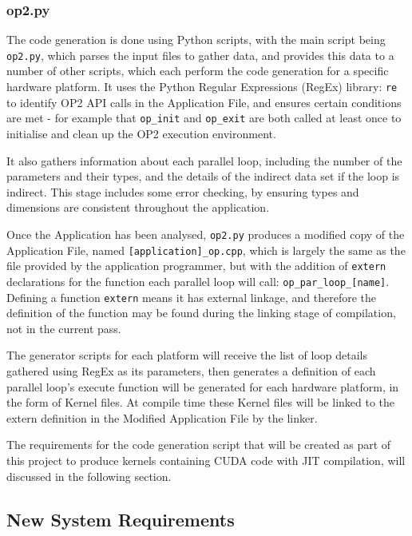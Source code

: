 \subsubsection{op2.py}
\label{ss:impl_op2}
The code generation is done using Python scripts, with the main script being \verb|op2.py|, which parses the input files to gather data, and provides this data to a number of other scripts, which each perform the code generation for a specific hardware platform. It uses the Python Regular Expressions (RegEx) library: \verb|re| \cite{re} to identify OP2 API calls in the Application File, and ensures certain conditions are met - for example that \verb|op_init| and \verb|op_exit| are both called at least once to initialise and clean up the OP2 execution environment.
\par
It also gathers information about each parallel loop, including the number of the parameters and their types, and the details of the indirect data set if the loop is indirect. This stage includes some error checking, by ensuring types and dimensions are consistent throughout the application.
\par
Once the Application has been analysed, \verb|op2.py| produces a modified copy of the Application File, named \verb|[application]_op.cpp|, which is largely the same as the file provided by the application programmer, but with the addition of \verb|extern| declarations for the function each parallel loop will call: \verb|op_par_loop_[name]|. Defining a function \verb|extern| means it has external linkage, and therefore the definition of the function may be found during the linking stage of compilation, not in the current pass.
\par
The generator scripts for each platform will receive the list of loop details gathered using RegEx as its parameters, then generates a definition of each parallel loop's execute function will be generated for each hardware platform, in the form of Kernel files. At compile time these Kernel files will be linked to the extern definition in the Modified Application File by the linker.
\par
The requirements for the code generation script that will be created as part of this project to produce kernels containing CUDA code with JIT compilation, will discussed in the following section.

\subsection{New System Requirements}
\label{ss:reqs}

